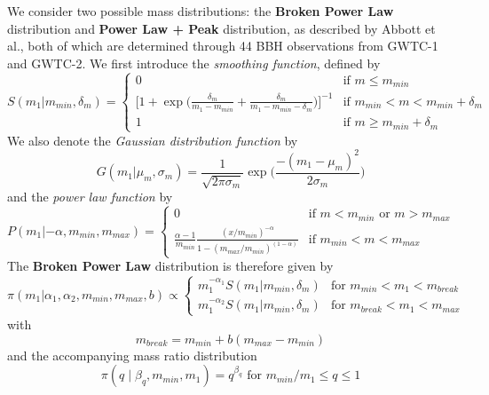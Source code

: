\documentclass{article}
\begin{document}
We consider two possible mass distributions: the \textbf{Broken Power Law} distribution and \textbf{Power Law + Peak} distribution, as described by Abbott et al., both of which are determined through 44 BBH observations from GWTC-1 and GWTC-2. We first introduce the \textit{smoothing function}, defined by 
\begin{equation}
    S(m_1 | m_{min}, \delta_m) = \begin{cases}
    0 & \text{if $m \leq m_{min}$} \\
    \Big[1 + \exp\Big(\frac{\delta_m}{m_1 - m_{min}} + \frac{\delta_m}{m_1-m_{min}-\delta_m} \Big) \Big]^{-1} & \text{if $m_{min} < m < m_{min} + \delta_m$} \\
    1 & \text{if $m \geq m_{min} + \delta_m$}
    \end{cases}
\end{equation}
We also denote the \textit{Gaussian distribution function} by 
\begin{equation}
    G(m_1 | \mu_m, \sigma_m) = \frac{1}{\sqrt{2\pi \sigma_m}} \exp \Big(\frac{-(m_1-\mu_m)^2}{2\sigma_m}\Big)
\end{equation}
and the \textit{power law function} by 
\begin{equation}
    P(m_1 | -\alpha, m_{min}, m_{max}) = \begin{cases}
    0 & \text{if $m < m_{min}$ or $m > m_{max}$} \\
    \frac{\alpha-1}{m_{min}} \frac{(x/m_{min})^{-\alpha}}{1-(m_{max}/m_{min})^{(1-\alpha)}} & \text{if $m_{min} < m < m_{max}$}
    \end{cases}
\end{equation}
The \textbf{Broken Power Law} distribution is therefore given by 
\begin{equation}
    \pi(m_1 | \alpha_1, \alpha_2, m_{min}, m_{max}, b) \propto \begin{cases}
    m_1^{-\alpha_1} S(m_1 | m_{min}, \delta_m) & \text{for $m_{min} < m_1 < m_{break}$} \\
    m_1^{-\alpha_2} S(m_1 | m_{min}, \delta_m) & \text{for $m_{break} < m_1 < m_{max}$}
    \end{cases}
\end{equation}
with 
\begin{equation}
    m_{break} = m_{min} + b(m_{max} - m_{min})
\end{equation}
and the accompanying mass ratio distribution 
\begin{equation}
    \pi(q \; | \; \beta_q, m_{min}, m_1) = q^{\beta_q} \text{  for $m_{min}/m_1 \leq q \leq 1$}
\end{equation}
\end{document}

